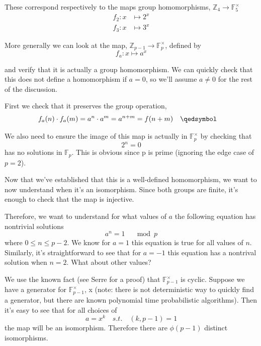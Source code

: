 \documentclass{article}
\begin{document}
These correspond respectively to the maps group homomorphisms, $ \mathbb{Z}_{4} \rightarrow \mathbb{F}_{5}^{\times} $
\begin{subequations}
\begin{align}
f_{2}: x & \mapsto 2^{x} \\
f_{3}: x & \mapsto 3^{x}
\end{align}
\end{subequations}

More generally we can look at the map, $ \mathbb{Z}_{p-1} \rightarrow \mathbb{F}_{p}^{\times} $, defined by
\begin{equation}
f_{a} : x \mapsto a^{x}
\end{equation}

and verify that it is actually a group homomorphism. We can quickly check that this does not define a homomorphism if $a=0$, so we'll assume $a\neq 0$ for the rest of the discussion.

First we check that it preserves the group operation,
\begin{subequations}
\begin{align}
f_{a}(n)\cdot f_{a}(m) & = a^{n} \cdot a^{m} = a^{n+m} = f(n+m) \quad \qedsymbol
\end{align}
\end{subequations}

We also need to ensure the image of this map is actually in $ \mathbb{F}_{p}^{\times} $ by checking that
\begin{equation}
2^{n} = 0
\end{equation}
has no solutions in $ \mathbb{F}_{p} $. This is obvious since p is prime (ignoring the edge case of $p=2$).

Now that we've established that this is a well-defined homomorphism, we want to now understand when it's an isomorphism. Since both groups are finite, it's enough to check that the map is injective.

Therefore, we want to understand for what values of $ a $ the following equation has nontrivial solutions
\begin{equation}
a^n = 1 \quad \mod p
\end{equation}
where $ 0 \leq n \leq p - 2 $. We know for $a=1$ this equation is true for all values of $n$. Similarly, it's straightforward to see that for $a=-1$ this equation has a nontrival solution when $n=2$. What about other values?

We use the known fact (see Serre for a proof) that $ \mathbb{F}_{p-1}^{\times} $ is cyclic. Suppose we have a generator for $ \mathbb{F}_{p-1}^{\times} $, x (note: there is not deterministic way to quickly find a generator, but there are known polynomial time probabilistic algorithms). Then it's easy to see that for all choices of
\begin{equation}
a = x^{k} \quad s.t. \quad (k, p - 1) = 1
\end{equation}
the map will be an isomorphism. Therefore there are $\phi(p-1)$ distinct isomorphisms.
\end{document}
